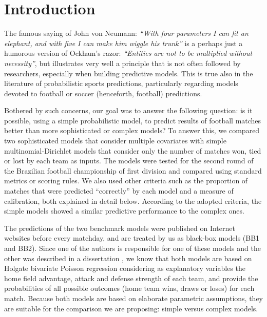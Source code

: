 \documentclass[journal,article,accept,moreauthors,pdftex,12pt,a4paper]{mdpi}
\begin{document}

    \section{Introduction}

    The famous saying of John von Neumann: {\it ``With four parameters I can fit an elephant, and with five I can make him wiggle his trunk''} is a perhaps just a humorous version of Ockham's razor:
    {\it``Entities are not to be multiplied without necessity''}, but illustrates very well a principle that is not often followed by researchers, especially when building predictive models.
    This is true also in the literature of probabilistic sports predictions, particularly regarding models devoted to football or soccer (henceforth, football) predictions.

    Bothered by such concerns, our goal was to answer the following question: is it possible, using a simple probabilistic model, to predict results of football matches better than more sophisticated or complex models?
    To answer this, we compared two sophisticated models that consider multiple covariates with simple multinomial-Dirichlet models that consider only the number of matches won, tied or lost by each team as inputs.
    The models were tested for the second round of the Brazilian football championship of first division and compared using standard metrics or scoring rules.
    We also used other criteria such as the proportion of matches that were predicted ``correctly'' by each model and a measure of calibration, both explained in detail below.
    According to the adopted criteria, the simple models showed a similar predictive performance to the complex ones.

    The predictions of the two benchmark models were published on Internet websites before every matchday, and are treated by us as black-box models (BB1 and BB2).
    Since one of the authors is responsible for one of these models and the other was described in a dissertation \citep{arruda2000}, we know that both models are based on Holgate bivariate Poisson regression considering as explanatory variables the home field advantage, attack and defense strength of each team, and provide the probabilities of all possible outcomes (home team wins, draws or loses) for each match.
    Because both models are based on elaborate parametric assumptions, they are suitable for the comparison we are proposing: simple versus complex models. 
\end{document}
